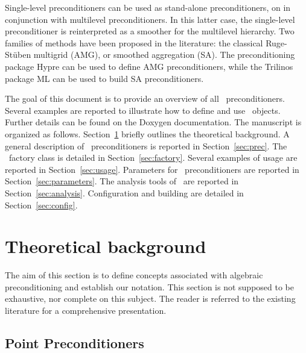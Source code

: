 \begin{remark}
Single-level preconditioners can be used as stand-alone preconditioners, on in
conjunction with multilevel preconditioners. In this latter case, the
single-level preconditioner is reinterpreted as a smoother for the multilevel
hierarchy. Two families of methods have been
proposed in the literature:
the classical Ruge-St\"uben multigrid (AMG), or smoothed aggregation (SA).
The preconditioning package Hypre can be used to define AMG preconditioners,
  while the Trilinos package ML can be used to build SA preconditioners.
\end{remark}

\smallskip

The goal of this document is to provide an overview of all \ifpack\
  preconditioners. Several examples are reported to illustrate how to define
  and use \ifpack\ objects. Further details can be found on the Doxygen
  documentation.
The manuscript is organized as follows. Section~\ref{sec:theo} briefly outlines
the theoretical background. A general description of \ifpack\
  preconditioners is reported in Section~\ref{sec:prec}.
The \ifpack\ factory class is detailed in
Section~\ref{sec:factory}. Several examples of usage are reported in
Section~\ref{sec:usage}. Parameters for \ifpack~preconditioners are reported in
Section~\ref{sec:parameters}. The analysis tools of \ifpack\ are reported in
Section~\ref{sec:analysis}. Configuration and building are detailed in
Section~\ref{sec:config}.

\section{Theoretical background}
\label{sec:theo}

The aim of this section is to define concepts associated with algebraic
preconditioning and establish our notation. This section is not
supposed to be exhaustive, nor complete on this subject. The reader is
referred to the existing literature for a comprehensive presentation.

\medskip

\subsection{Point Preconditioners}
\label{sec:point}

